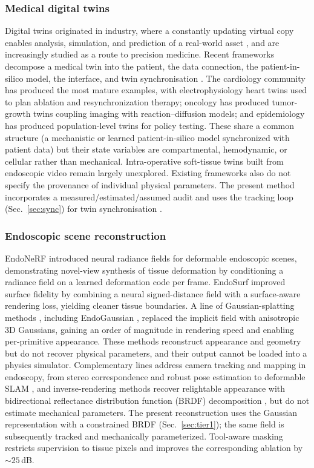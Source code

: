\documentclass[pdflatex,lineno,referee,sn-vancouver,Numbered]{sn-jnl}
\begin{document}
\subsubsection{Medical digital twins}
Digital twins originated in industry, where a constantly updating virtual
copy enables analysis, simulation, and prediction of a real-world asset
\cite{tao2019,fuller2020}, and are increasingly studied as a route to
precision medicine. Recent frameworks decompose a medical twin into the
patient, the data connection, the patient-in-silico model, the interface,
and twin synchronisation \cite{landig2025,laubenbacher2024}. The
cardiology community has produced the most mature examples, with
electrophysiology heart twins used to plan ablation and resynchronization
therapy; oncology has produced tumor-growth twins coupling imaging with
reaction--diffusion models; and epidemiology has produced population-level
twins for policy testing. These share a common structure (a mechanistic
or learned patient-in-silico model synchronized with patient data) but
their state variables are compartmental, hemodynamic, or cellular rather
than mechanical. Intra-operative soft-tissue twins built from endoscopic
video remain largely unexplored. Existing frameworks also do not specify
the provenance of individual physical parameters. The present method
incorporates a measured/estimated/assumed audit and uses the tracking loop
(Sec.~\ref{sec:sync}) for twin synchronisation \cite{landig2025}.

\subsubsection{Endoscopic scene reconstruction}
EndoNeRF \cite{endonerf} introduced neural radiance fields \cite{nerf}
for deformable endoscopic scenes, demonstrating novel-view synthesis of
tissue deformation by conditioning a radiance field on a learned
deformation code per frame. EndoSurf \cite{endosurf} improved surface
fidelity by combining a neural signed-distance field with a surface-aware
rendering loss, yielding cleaner tissue boundaries. A line of
Gaussian-splatting methods \cite{gaussiansplatting}, including EndoGaussian
\cite{endogaussian}, replaced
the implicit field with anisotropic 3D Gaussians, gaining an order of
magnitude in rendering speed and enabling per-primitive appearance. These
methods reconstruct appearance and geometry but do not recover physical
parameters, and their output cannot be loaded into a physics simulator.
Complementary lines address camera tracking and mapping in endoscopy, from
stereo correspondence \cite{scared} and robust pose estimation
\cite{hayoz2023} to deformable SLAM \cite{defslam}, and inverse-rendering
methods recover relightable appearance with bidirectional reflectance
distribution function (BRDF) decomposition
\cite{gsir2024,relightable3dgs}, but do not estimate mechanical parameters.
The present reconstruction uses the Gaussian representation with a
constrained BRDF (Sec.~\ref{sec:tier1}); the same field is subsequently
tracked and mechanically parameterized. Tool-aware masking restricts
supervision to tissue pixels and improves the corresponding ablation by
${\sim}25$\,dB.
\end{document}
